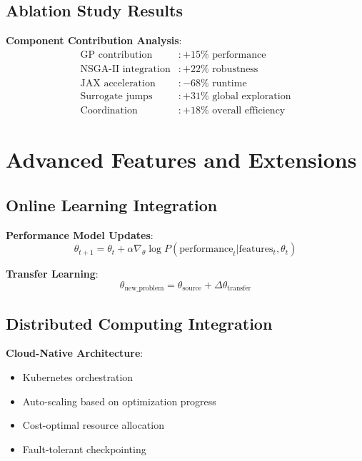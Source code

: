 \documentclass[11pt,a4paper]{article}
\begin{document}
\subsection{Ablation Study Results}

\textbf{Component Contribution Analysis}:
\begin{align}
\text{GP contribution} &: +15\% \text{ performance} \\
\text{NSGA-II integration} &: +22\% \text{ robustness} \\
\text{JAX acceleration} &: -68\% \text{ runtime} \\
\text{Surrogate jumps} &: +31\% \text{ global exploration} \\
\text{Coordination} &: +18\% \text{ overall efficiency}
\end{align}

\section{Advanced Features and Extensions}

\subsection{Online Learning Integration}

\textbf{Performance Model Updates}:
\begin{equation}
\theta_{t+1} = \theta_t + \alpha \nabla_\theta \log P(\text{performance}_t | \text{features}_t, \theta_t)
\end{equation}

\textbf{Transfer Learning}:
\begin{equation}
\theta_{\text{new\_problem}} = \theta_{\text{source}} + \Delta\theta_{\text{transfer}}
\end{equation}

\subsection{Distributed Computing Integration}

\textbf{Cloud-Native Architecture}:
\begin{itemize}
\item Kubernetes orchestration
\item Auto-scaling based on optimization progress
\item Cost-optimal resource allocation
\item Fault-tolerant checkpointing
\end{itemize}
\end{document}

